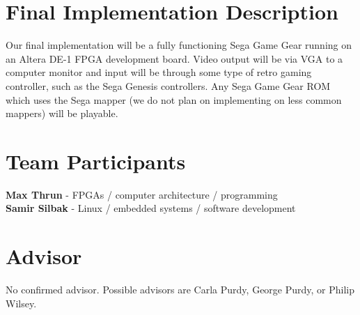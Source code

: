 \documentclass[12pt]{article}
\begin{document}
\section*{Final Implementation Description}
Our final implementation will be a fully functioning Sega Game Gear running on an Altera DE-1 FPGA
development board. Video output will be via VGA to a computer monitor and input will be through some type of retro
gaming controller, such as the Sega Genesis controllers. Any Sega Game Gear ROM which uses the Sega mapper (we do not plan on implementing on less common mappers) will be playable.

\section*{Team Participants}
{\bf Max Thrun} - FPGAs / computer architecture / programming  
\\
{\bf Samir Silbak} - Linux / embedded systems / software development

\section*{Advisor}
No confirmed advisor. Possible advisors are Carla Purdy, George Purdy, or Philip Wilsey.
\end{document}
